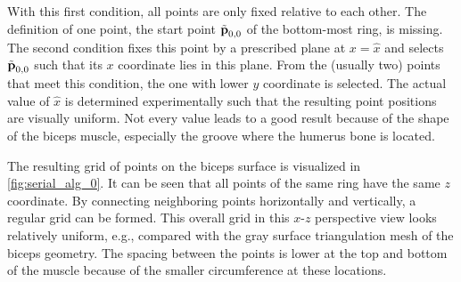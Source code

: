 With this first condition, all points are only fixed relative to each other. The definition of one point, the start point $\tilde{\textbf{p}}_{0,0}$ of the bottom-most ring, is missing. The second condition fixes this point by a prescribed plane at $x = \hat{x}$ and selects $\tilde{\textbf{p}}_{0,0}$ such that its $x$ coordinate lies in this plane. From the (usually two) points that meet this condition, the one with lower $y$ coordinate is selected. The actual value of $\hat{x}$ is determined experimentally such that the resulting point positions are visually uniform. Not every value leads to a good result because of the shape of the biceps muscle, especially the groove where the humerus bone is located.

The resulting grid of points on the biceps surface is visualized in \cref{fig:serial_alg_0}. It can be seen that all points of the same ring have the same $z$ coordinate. By connecting neighboring points horizontally and vertically, a regular grid can be formed. This overall grid in this $x$-$z$ perspective view looks relatively uniform, e.g., compared with the gray surface triangulation mesh of the biceps geometry. The spacing between the points is lower at the top and bottom of the muscle because of the smaller circumference at these locations.

